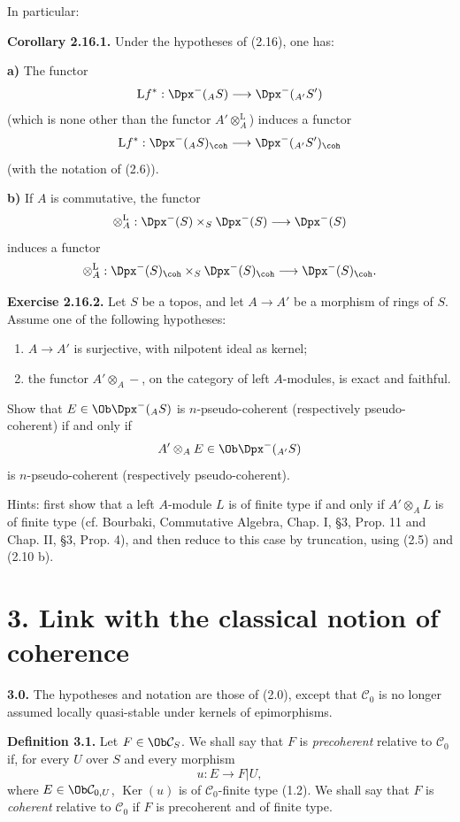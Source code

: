 \documentclass[11pt]{article}
\providecommand{\Ker}{\operatorname{Ker}}
\begin{document}
In particular:

\textbf{Corollary 2.16.1.} Under the hypotheses of (2.16), one has:

\textbf{a)} The functor
\[
  \mathrm L f^*: \Dpx^-(_A S)\longrightarrow \Dpx^-(_{A'}S')
\]
(which is none other than the functor \(A'\otimes_A^{\mathrm L}\)) induces a functor
\[
  \mathrm L f^*: \Dpx^-(_A S)_{\coh}\longrightarrow \Dpx^-(_{A'}S')_{\coh}
\]
(with the notation of (2.6)).

\textbf{b)} If \(A\) is commutative, the functor
\[
  \otimes_A^{\mathrm L}:\Dpx^-(S)\times_S\Dpx^-(S)
  \longrightarrow \Dpx^-(S)
\]
induces a functor
\[
  \otimes_A^{\mathrm L}:\Dpx^-(S)_{\coh}\times_S\Dpx^-(S)_{\coh}
  \longrightarrow \Dpx^-(S)_{\coh} .
\]

\textbf{Exercise 2.16.2.} Let \(S\) be a topos, and let \(A\to A'\) be a morphism of rings of \(S\). Assume one of the following hypotheses:
\begin{enumerate}[label=(\roman*)]
\item \(A\to A'\) is surjective, with nilpotent ideal as kernel;
\item the functor \(A'\otimes_A-\), on the category of left \(A\)-modules, is exact and faithful.
\end{enumerate}
Show that \(E\in\Ob\Dpx^-(_A S)\) is \(n\)-pseudo-coherent (respectively pseudo-coherent) if and only if
\[
  A'\otimes_A E\in\Ob\Dpx^-(_{A'}S)
\]
is \(n\)-pseudo-coherent (respectively pseudo-coherent).

Hints: first show that a left \(A\)-module \(L\) is of finite type if and only if \(A'\otimes_A L\) is of finite type (cf. Bourbaki, Commutative Algebra, Chap. I, §3, Prop. 11 and Chap. II, §3, Prop. 4), and then reduce to this case by truncation, using (2.5) and (2.10 b).

\section*{3. Link with the classical notion of coherence}

\textbf{3.0.} The hypotheses and notation are those of (2.0), except that \(\mathcal C_0\) is no longer assumed locally quasi-stable under kernels of epimorphisms.

\textbf{Definition 3.1.} Let \(F\in\Ob\mathcal C_S\). We shall say that \(F\) is \emph{precoherent} relative to \(\mathcal C_0\) if, for every \(U\) over \(S\) and every morphism
\[
  u:E\longrightarrow F|U,
\]
where \(E\in\Ob\mathcal C_{0,U}\), \(\Ker(u)\) is of \(\mathcal C_0\)-finite type (1.2). We shall say that \(F\) is \emph{coherent} relative to \(\mathcal C_0\) if \(F\) is precoherent and of finite type.
\end{document}
